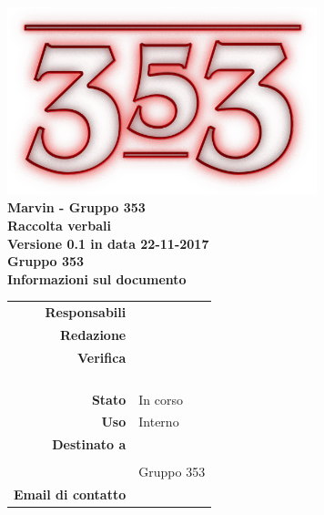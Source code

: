 \documentclass[openany, a4paper, 12pt]{report}
\begin{document}
\begin{titlepage}
	\centering
	\vfill
	{
		\bfseries
		\vskip2cm
		\includegraphics[width=9cm]{../../common/images/logo.png} \\
		\Large Marvin - Gruppo 353\\
		\vfill
		\Huge Raccolta verbali\\
		\Large Versione 0.1 in data 22-11-2017\\
		\vfill
		\large Gruppo 353\\
		\vfill
	\normalsize Informazioni sul documento\\
\begin{table}[htbp]
	\centering
	\renewcommand\arraystretch{1.2}
	\begin{tabular}{r|l}
		\hline
		\textbf{Responsabili}	& \Elena\\
		
		\textbf{Redazione} 		& \Mirco\\
		
		\textbf{Verifica} 		& \Parwinder\\
								& \Davide\\
								& \Gianluca\\
								& \Valentina\\
								& \Riccardo\\
						
		\textbf{Stato} 			& In corso\\
		\textbf{Uso}			& Interno\\
		\textbf{Destinato a}   	& \Vardanega\\
								& \Cardin\\
								& Gruppo 353\\
		
						
		\textbf{Email di contatto}	& \mailleaf
	\end{tabular}
\end{table}
		\vfill
	}    
\end{titlepage}
\tableofcontents
\newpage
{}

 
\end{document}
